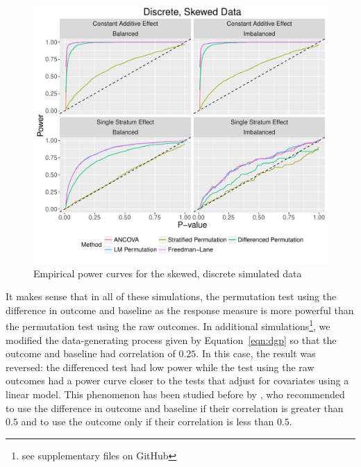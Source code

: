 \documentclass[11pt]{article}
\begin{document}
\begin{figure}
\centering
\includegraphics[width = \textwidth]{fig/skewed_simulation_power}
\caption{Empirical power curves for the skewed, discrete simulated data}
\label{fig:skewed_sim_power}
\end{figure}

\begin{center}

\end{center}

It makes sense that in all of these simulations, the permutation test using the difference in outcome and baseline as the response measure is more powerful than the permutation test using the raw outcomes.
In additional simulations\footnote{see supplementary files on GitHub}, we modified the data-generating process given by Equation~\ref{eqn:dgp} so that the outcome and baseline had correlation of $0.25$.
In this case, the result was reversed: the differenced test had low power while the test using the raw outcomes had a power curve closer to the tests that adjust for covariates using a linear model.
This phenomenon has been studied before by \cite{frison_repeated_1992}, who recommended to use the difference in outcome and baseline if their correlation is greater than $0.5$ and to use the outcome only if their correlation is less than $0.5$.
\end{document}
